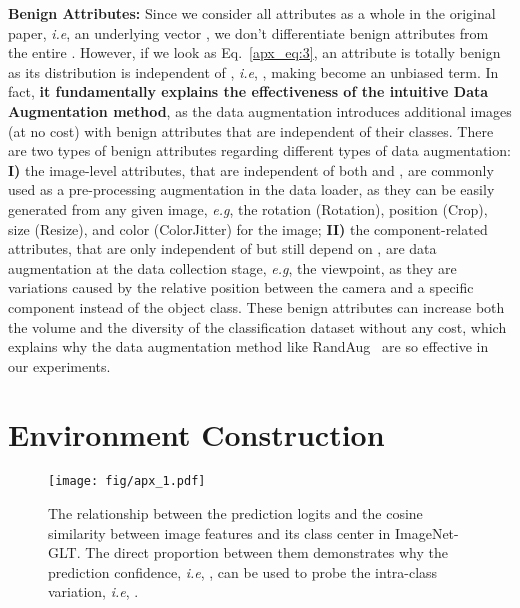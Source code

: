 \documentclass{article}
\def\eg{\emph{e.g}} \def\Eg{\emph{E.g}}
\def\ie{\emph{i.e}} \def\Ie{\emph{I.e}}
\begin{document}
\textbf{Benign Attributes:} Since we consider all attributes as a whole in the original paper, \ie, an underlying vector , we don't differentiate benign attributes from the entire . However, if we look as Eq.~\eqref{apx_eq:3}, an attribute  is totally benign as its distribution is independent of , \ie, , making  become an unbiased term. In fact, \textbf{it fundamentally explains the effectiveness of the intuitive Data Augmentation method}, as the data augmentation introduces additional images (at no cost) with benign attributes that are independent of their classes. There are two types of benign attributes regarding different types of data augmentation: \textbf{I)} the image-level attributes, that are independent of both  and , are commonly used as a pre-processing augmentation in the data loader, as they can be easily generated from any given image, \eg, the rotation (Rotation), position (Crop), size (Resize), and color (ColorJitter) for the image; \textbf{II)} the component-related attributes, that are only independent of  but still depend on , are data augmentation at the data collection stage, \eg, the viewpoint, as they are variations caused by the relative position between the camera and a specific component instead of the object class. These benign attributes can increase both the volume and the diversity of the classification dataset without any cost, which explains why the data augmentation method like RandAug~\cite{cubuk2020randaugment} are so effective in our experiments.


\section{Environment Construction} 

\begin{figure}[t]
   \begin{minipage}[b]{1.0\linewidth}
   \centerline{\texttt{[image: fig/apx\_1.pdf]}}
   \end{minipage}
   \caption{The relationship between the prediction logits and the cosine similarity between image features and its class center in ImageNet-GLT. The direct proportion between them demonstrates why the prediction confidence, \ie, , can be used to probe the intra-class variation, \ie, .}
   \label{fig:apx1} \end{figure}
\end{document}
